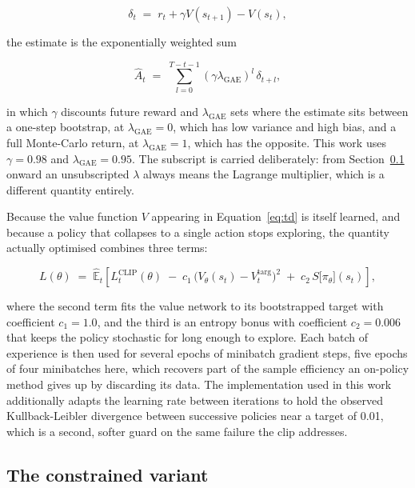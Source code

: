 \begin{equation}
  \delta_t \;=\; r_t + \gamma V(s_{t+1}) - V(s_t),
  \label{eq:td}
\end{equation}

the estimate is the exponentially weighted sum

\begin{equation}
  \hat{A}_t \;=\; \sum_{l=0}^{T-t-1} (\gamma\lambda_{\text{GAE}})^{l}\,\delta_{t+l},
  \label{eq:gae}
\end{equation}

in which \(\gamma\) discounts future reward and \(\lambda_{\text{GAE}}\) sets where the estimate
sits between a one-step bootstrap, at \(\lambda_{\text{GAE}} = 0\), which has low variance and high
bias, and a full Monte-Carlo return, at \(\lambda_{\text{GAE}} = 1\), which has the opposite. This
work uses \(\gamma = 0.98\) and \(\lambda_{\text{GAE}} = 0.95\). The subscript is carried
deliberately: from Section~\ref{sec:m-ppo-to-cppo} onward an unsubscripted \(\lambda\) always means
the Lagrange multiplier, which is a different quantity entirely.

Because the value function \(V\) appearing in Equation~\ref{eq:td} is itself learned, and because a
policy that collapses to a single action stops exploring, the quantity actually optimised combines
three terms:

\begin{equation}
  L(\theta) \;=\; \hat{\mathbb{E}}_t\!\left[
  L^{\text{CLIP}}_t(\theta)
  \;-\; c_1\,\bigl(V_\theta(s_t) - V_t^{\text{targ}}\bigr)^{2}
  \;+\; c_2\,S\bigl[\pi_\theta\bigr](s_t)\right],
  \label{eq:ppo-full}
\end{equation}

where the second term fits the value network to its bootstrapped target with coefficient
\(c_1 = 1.0\), and the third is an entropy bonus with coefficient \(c_2 = 0.006\) that keeps the
policy stochastic for long enough to explore. Each batch of experience is then used for several
epochs of minibatch gradient steps, five epochs of four minibatches here, which recovers part of the
sample efficiency an on-policy method gives up by discarding its data. The implementation used in
this work additionally adapts the learning rate between iterations to hold the observed
Kullback-Leibler divergence between successive policies near a target of 0.01, which is a second,
softer guard on the same failure the clip addresses.

\subsection{The constrained variant}\label{sec:m-ppo-to-cppo}

